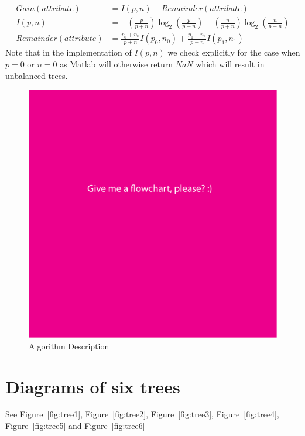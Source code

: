 \documentclass[11pt,a4paper]{article}
\begin{document}
\begin{align}
Gain(attribute)  &= I(p,n) - Remainder(attribute)\\
I(p,n) &= -\left(\frac{p}{p+n}\right)\log_2{\left(\frac{p}{p+n}\right)} -\left(\frac{n}{p+n}\right)\log_2{\left(\frac{n}{p+n}\right)}\\
Remainder(attribute) &= \frac{p_0 + n_0}{p+n}I(p_0,n_0) + \frac{p_1 + n_1}{p + n}I(p_1,n_1)
\end{align}
Note that in the implementation of $I(p,n)$ we check explicitly for the case when $p = 0$ or $n = 0$ as Matlab will otherwise return $NaN$ which will result in unbalanced trees.

\begin{figure}[!ht]
\centering
\includegraphics[scale=0.7]{images/flowchart.pdf}
\caption{Algorithm Description}
\label{fig:flowchart}
\end{figure}
%
\section{Diagrams of six trees}
See Figure~\ref{fig:tree1}, Figure~\ref{fig:tree2}, Figure~\ref{fig:tree3}, Figure~\ref{fig:tree4}, Figure~\ref{fig:tree5} and Figure~\ref{fig:tree6}
\end{document}
